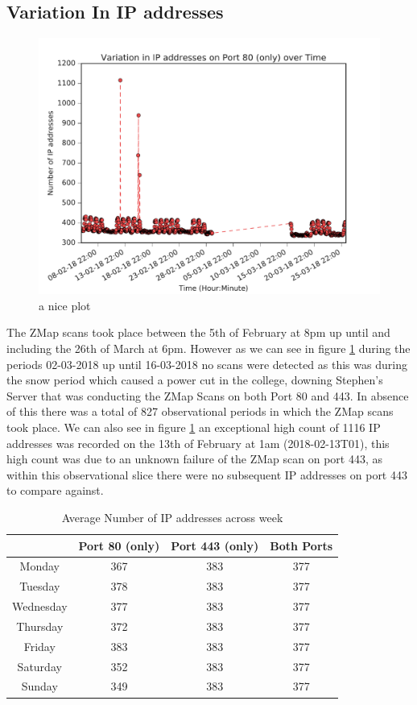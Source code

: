 \documentclass[a4wide,leqno,12pt]{report}
\begin{document}
\subsection{Variation In IP addresses}
\begin{figure}[H]
\centering
\includegraphics[scale=.5]{pdf_images/VariationInIpAddressesOnPort80OverTime}
\caption{a nice plot}
\label{fig:port80ZMap}
\end{figure}

The ZMap scans took place between the 5th of February at 8pm up until and including the 26th of March at 6pm. However as we can see in figure \ref{fig:port80ZMap} during the periods
02-03-2018  up until 16-03-2018 no scans were detected as this was during the snow period which caused a power cut in the college, downing  Stephen's Server that was conducting the ZMap Scans on both Port 80 and 443. In absence of this there was a total of 827 observational periods in which the ZMap scans took place. We can also see in figure \ref{fig:port80ZMap} an exceptional high count of 1116 IP addresses was recorded on the 13th of February at 1am (2018-02-13T01), this high count was due to an unknown failure of the ZMap scan on port 443, as within this observational slice there were no subsequent IP addresses on port 443 to compare against.
\begin{table}
\centering
\begin{tabular}{||c c c c ||}
 \hline
  & Port 80 (only) & Port 443 (only) & Both Ports \\ [0.5ex]
 \hline\hline
 Monday & 367 & 383 & 377  \\
 Tuesday & 378 & 383 & 377 \\
 Wednesday & 377 & 383 & 377 \\
 Thursday & 372 & 383 & 377  \\
 Friday & 383 & 383 & 377 \\
 Saturday & 352 & 383 & 377\\
 Sunday & 349 & 383 & 377\\[1ex]
 \hline
\end{tabular}
\caption{Average Number of IP addresses across week}
\label{table:1}
\end{table}
\end{document}
